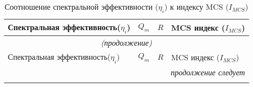 \begin{longtable}{|l|l|l|l|}
\caption{Соотношение спектральной эффективности ($\eta_{i}$) к индексу MCS ($I_{MCS}$)}\label{MCS_spectr}
 \hline
 \hline
Спектральная эффективность($\eta_{i}$) & $Q_{m}$ & $R$        & MCS индекс ($I_{MCS}$) \\ \hline \hline



    \endfirsthead   \hline
 \multicolumn{4}{|c|}{\small\slshape (продолжение)}        \\ \hline
Спектральная эффективность($\eta_{i}$) & $Q_{m}$ & $R$        & MCS индекс ($I_{MCS}$)   \\ \hline \hline
        
                                              \endhead        \hline
 \multicolumn{4}{|r|}{\small\slshape продолжение следует}  \\ \hline
                                              \endfoot        \hline
                                              \endlastfoot






\end{longtable}

